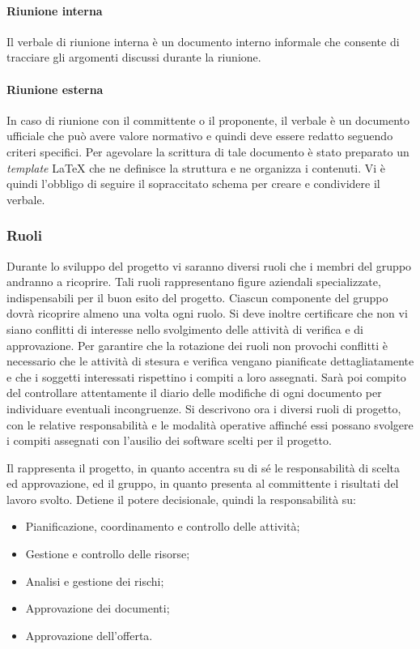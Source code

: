 \documentclass[12pt,a4paper]{article}
\begin{document}
\paragraph{Riunione interna}
Il verbale di riunione interna è un documento interno informale che consente di tracciare gli argomenti discussi durante la riunione.

\paragraph{Riunione esterna}
In caso di riunione con il committente o il proponente, il verbale è un documento ufficiale che può avere valore normativo e quindi deve essere redatto seguendo criteri specifici.
Per agevolare la scrittura di tale documento è stato preparato un \emph{template} \LaTeX{} che ne definisce la struttura e ne organizza i contenuti. Vi è quindi l'obbligo di seguire il sopraccitato schema per creare e condividere il verbale.

\subsubsection{Ruoli}\label{Ruoli}
Durante lo sviluppo del progetto vi saranno diversi ruoli che i membri del gruppo andranno a ricoprire. Tali ruoli rappresentano figure aziendali specializzate, indispensabili per il buon esito del progetto. Ciascun componente del gruppo dovrà ricoprire almeno una volta ogni ruolo. Si deve inoltre certificare che non vi siano conflitti di interesse nello svolgimento delle attività di verifica e di approvazione.
Per garantire che la rotazione dei ruoli non provochi conflitti è necessario che le attività di stesura e verifica vengano pianificate dettagliatamente e che i soggetti interessati rispettino i compiti a loro assegnati. Sarà poi compito del \VR{} controllare attentamente il diario delle modifiche di ogni documento per individuare eventuali incongruenze.
Si descrivono ora i diversi ruoli di progetto, con le relative responsabilità e le modalità operative affinché essi possano svolgere i compiti assegnati con l'ausilio dei software scelti per il progetto.

Il \PM{} rappresenta il progetto, in quanto accentra su di sé le responsabilità di scelta ed approvazione, ed il gruppo, in quanto presenta al committente i risultati del lavoro svolto.
Detiene il potere decisionale, quindi la responsabilità su:
\begin{itemize}
	\item Pianificazione, coordinamento e controllo delle attività;
	\item Gestione e controllo delle risorse;
	\item Analisi e gestione dei rischi;
	\item Approvazione dei documenti;
	\item Approvazione dell'offerta.
\end{itemize}
\end{document}
